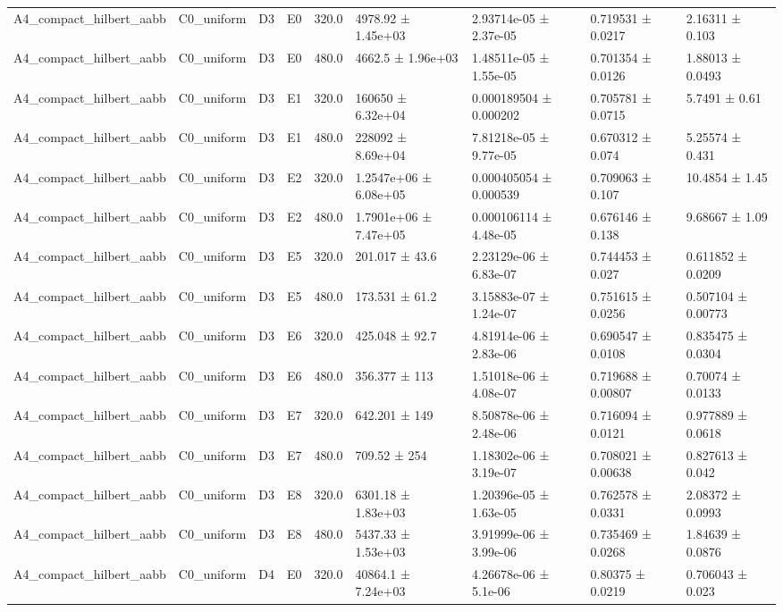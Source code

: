 \begin{table}
\begin{tabular}{lllllllll}
A4\_compact\_hilbert\_aabb & C0\_uniform & D3 & E0 & 320.0 & 4978.92 ± 1.45e+03 & 2.93714e-05 ± 2.37e-05 & 0.719531 ± 0.0217 & 2.16311 ± 0.103 \\
A4\_compact\_hilbert\_aabb & C0\_uniform & D3 & E0 & 480.0 & 4662.5 ± 1.96e+03 & 1.48511e-05 ± 1.55e-05 & 0.701354 ± 0.0126 & 1.88013 ± 0.0493 \\
A4\_compact\_hilbert\_aabb & C0\_uniform & D3 & E1 & 320.0 & 160650 ± 6.32e+04 & 0.000189504 ± 0.000202 & 0.705781 ± 0.0715 & 5.7491 ± 0.61 \\
A4\_compact\_hilbert\_aabb & C0\_uniform & D3 & E1 & 480.0 & 228092 ± 8.69e+04 & 7.81218e-05 ± 9.77e-05 & 0.670312 ± 0.074 & 5.25574 ± 0.431 \\
A4\_compact\_hilbert\_aabb & C0\_uniform & D3 & E2 & 320.0 & 1.2547e+06 ± 6.08e+05 & 0.000405054 ± 0.000539 & 0.709063 ± 0.107 & 10.4854 ± 1.45 \\
A4\_compact\_hilbert\_aabb & C0\_uniform & D3 & E2 & 480.0 & 1.7901e+06 ± 7.47e+05 & 0.000106114 ± 4.48e-05 & 0.676146 ± 0.138 & 9.68667 ± 1.09 \\
A4\_compact\_hilbert\_aabb & C0\_uniform & D3 & E5 & 320.0 & 201.017 ± 43.6 & 2.23129e-06 ± 6.83e-07 & 0.744453 ± 0.027 & 0.611852 ± 0.0209 \\
A4\_compact\_hilbert\_aabb & C0\_uniform & D3 & E5 & 480.0 & 173.531 ± 61.2 & 3.15883e-07 ± 1.24e-07 & 0.751615 ± 0.0256 & 0.507104 ± 0.00773 \\
A4\_compact\_hilbert\_aabb & C0\_uniform & D3 & E6 & 320.0 & 425.048 ± 92.7 & 4.81914e-06 ± 2.83e-06 & 0.690547 ± 0.0108 & 0.835475 ± 0.0304 \\
A4\_compact\_hilbert\_aabb & C0\_uniform & D3 & E6 & 480.0 & 356.377 ± 113 & 1.51018e-06 ± 4.08e-07 & 0.719688 ± 0.00807 & 0.70074 ± 0.0133 \\
A4\_compact\_hilbert\_aabb & C0\_uniform & D3 & E7 & 320.0 & 642.201 ± 149 & 8.50878e-06 ± 2.48e-06 & 0.716094 ± 0.0121 & 0.977889 ± 0.0618 \\
A4\_compact\_hilbert\_aabb & C0\_uniform & D3 & E7 & 480.0 & 709.52 ± 254 & 1.18302e-06 ± 3.19e-07 & 0.708021 ± 0.00638 & 0.827613 ± 0.042 \\
A4\_compact\_hilbert\_aabb & C0\_uniform & D3 & E8 & 320.0 & 6301.18 ± 1.83e+03 & 1.20396e-05 ± 1.63e-05 & 0.762578 ± 0.0331 & 2.08372 ± 0.0993 \\
A4\_compact\_hilbert\_aabb & C0\_uniform & D3 & E8 & 480.0 & 5437.33 ± 1.53e+03 & 3.91999e-06 ± 3.99e-06 & 0.735469 ± 0.0268 & 1.84639 ± 0.0876 \\
A4\_compact\_hilbert\_aabb & C0\_uniform & D4 & E0 & 320.0 & 40864.1 ± 7.24e+03 & 4.26678e-06 ± 5.1e-06 & 0.80375 ± 0.0219 & 0.706043 ± 0.023 \\

\end{tabular}
\end{table}

